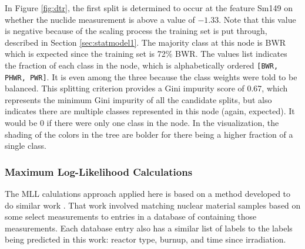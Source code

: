 In Figure \ref{fig:dtr}, the first split is determined to occur at the feature
Sm149 on whether the nuclide measurement is above a value of $-1.33$. Note that
this value is negative because of the scaling process the training set is put
through, described in Section \ref{sec:statmodel1}. The
majority class at this node is \gls{BWR} which is expected since the training
set is 72\% \gls{BWR}.  The values list indicates the fraction of each class in
the node, which is alphabetically ordered \texttt{[BWR, PHWR, PWR]}. It is even
among the three because the class weights were told to be balanced.  This
splitting criterion provides a Gini impurity score of 0.67, which represents
the minimum Gini impurity of all the candidate splits, but also indicates there
are multiple classes represented in this node (again, expected).  It would be 0
if there were only one class in the node.  In the visualization, the shading of
the colors in the tree are bolder for there being a higher fraction of a single
class.

\subsubsection{Maximum Log-Likelihood Calculations}

The \gls{MLL} calulations approach applied here is based on a method developed
to do similar work \cite{mll_method, mll_validate, mll_sensitivity}.  That work
involved matching nuclear material samples based on some select measurements to
entries in a database of containing those measurements.
Each database entry also has a similar list of labels to the labels being
predicted in this work: reactor type, burnup, and time since irradiation.

